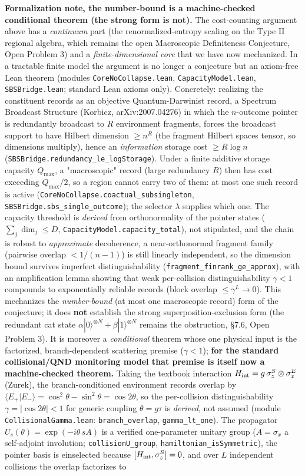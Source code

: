 \documentclass[11pt,a4paper]{article}
\begin{document}
\textbf{Formalization note, the number-bound is a machine-checked conditional theorem (the strong form is not).} The cost-counting argument above has a \emph{continuum} part (the renormalized-entropy scaling on the Type II regional algebra, which remains the open Macroscopic Definiteness Conjecture, Open Problem 3) and a \emph{finite-dimensional core} that we have now mechanized. In a tractable finite model the argument is no longer a conjecture but an axiom-free Lean theorem (modules \texttt{CoreNoCollapse.lean}, \texttt{CapacityModel.lean}, \texttt{SBSBridge.lean}; standard Lean axioms only). Concretely: realizing the constituent records as an objective Quantum-Darwinist record, a Spectrum Broadcast Structure (Korbicz, arXiv:2007.04276) in which the $n$-outcome pointer is redundantly broadcast to $R$ environment fragments, forces the broadcast support to have Hilbert dimension $\ge n^{R}$ (the fragment Hilbert spaces tensor, so dimensions multiply), hence an \emph{information} storage cost $\ge R\log n$ (\texttt{SBSBridge.redundancy\_le\_logStorage}). Under a finite additive storage capacity $Q_{\max}$, a "macroscopic" record (large redundancy $R$) then has cost exceeding $Q_{\max}/2$, so a region cannot carry two of them: at most one such record is active (\texttt{CoreNoCollapse.coactual\_subsingleton}, \texttt{SBSBridge.sbs\_single\_outcome}); the selector $\lambda$ supplies which one. The capacity threshold is \emph{derived} from orthonormality of the pointer states ($\sum_j\dim_j\le D$, \texttt{CapacityModel.capacity\_total}), not stipulated, and the chain is robust to \emph{approximate} decoherence, a near-orthonormal fragment family (pairwise overlap $<1/(n-1)$) is still linearly independent, so the dimension bound survives imperfect distinguishability (\texttt{fragment\_finrank\_ge\_approx}), with an amplification lemma showing that weak per-collision distinguishability $\gamma<1$ compounds to exponentially reliable records (block overlap $\le\gamma^{L}\to 0$). This mechanizes the \emph{number-bound} (at most one macroscopic record) form of the conjecture; it does \textbf{not} establish the strong superposition-exclusion form (the redundant cat state $\alpha|0\rangle^{\otimes N}+\beta|1\rangle^{\otimes N}$ remains the obstruction, §7.6, Open Problem 3). It is moreover a \emph{conditional} theorem whose one physical input is the factorized, branch-dependent scattering premise ($\gamma<1$); \textbf{for the standard collisional/QND monitoring model that premise is itself now a machine-checked theorem.} Taking the textbook interaction $H_{\rm int} = g\,\sigma_z^S \otimes \sigma_x^E$ (Zurek), the branch-conditioned environment records overlap by $\langle E_+|E_-\rangle = \cos^2\theta - \sin^2\theta = \cos 2\theta$, so the per-collision distinguishability $\gamma = |\cos 2\theta| < 1$ for generic coupling $\theta = g\tau$ is \emph{derived}, not assumed (module \texttt{CollisionalGamma.lean}: \texttt{branch\_overlap}, \texttt{gamma\_lt\_one}). The propagator $U_s(\theta) = \exp(-i\theta\,sA)$ is a verified one-parameter unitary group ($A = \sigma_x$ a self-adjoint involution; \texttt{collisionU\_group}, \texttt{hamiltonian\_isSymmetric}), the pointer basis is einselected because $[H_{\rm int},\sigma_z^S]=0$, and over $L$ independent collisions the overlap factorizes to 
\end{document}
